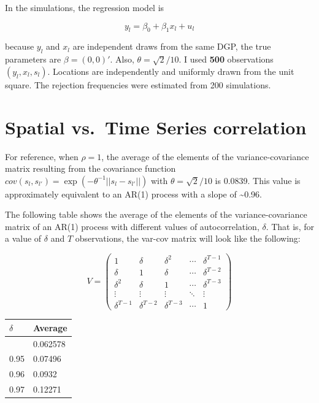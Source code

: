 \documentclass[
]{article}
\begin{document}
In the simulations, the regression model is

\[
    y_l=\beta_0 + \beta_1 x_l + u_l
\]

because \(y_l\) and \(x_l\) are independent draws from the same DGP, the
true parameters are \(\beta=(0,0)'\). Also, \(\theta=\sqrt{2}/10\). I
used \textbf{500} observations \((y_l,x_l,s_l)\). Locations are
independently and uniformly drawn from the unit square. The rejection
frequencies were estimated from 200 simulations.

\section{Spatial vs.~Time Series correlation}\label{sec-ar1}

For reference, when \(\rho=1\), the average of the elements of the
variance-covariance matrix resulting from the covariance function
\(cov(s_l,s_{l'})=\exp(-\theta^{-1}||s_l-s_{l'}||)\) with
\(\theta=\sqrt{2}/10\) is 0.0839. This value is approximately equivalent
to an AR(1) process with a slope of \textasciitilde0.96.

The following table shows the average of the elements of the
variance-covariance matrix of an AR(1) process with different values of
autocorrelation, \(\delta\). That is, for a value of \(\delta\) and
\(T\) observations, the var-cov matrix will look like the following:

\[
    V = \begin{pmatrix}
    1 & \delta & \delta^2 & \cdots & \delta^{T-1} \\
    \delta & 1 & \delta & \cdots & \delta^{T-2} \\
    \delta^2 & \delta & 1 & \cdots & \delta^{T-3} \\
    \vdots & \vdots & \vdots & \ddots & \vdots \\
    \delta^{T-1} & \delta^{T-2} & \delta^{T-3} & \cdots & 1
    \end{pmatrix}
\]

\begin{longtable}[]{@{}ll@{}}
\toprule\noalign{}
\(\delta\) & Average \\
\midrule\noalign{}
\endhead
\bottomrule\noalign{}
\endlastfoot
0.94 & 0.062578 \\
0.95 & 0.07496 \\
0.96 & 0.0932 \\
0.97 & 0.12271 \\
\end{longtable}
\end{document}
